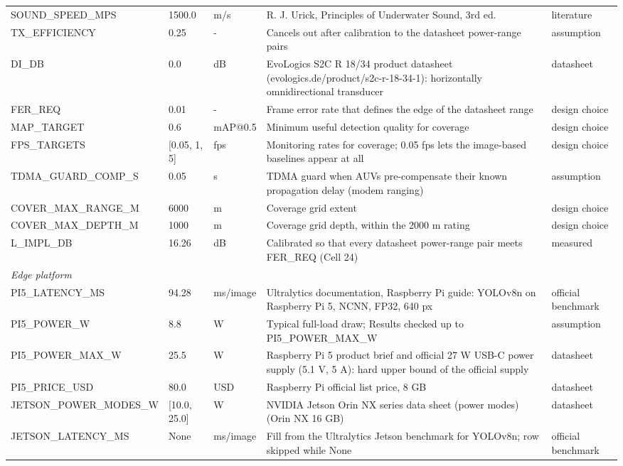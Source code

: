 \begin{table}[t]
\begin{tabular}{p{3.3cm}p{2.6cm}p{1.6cm}p{6.6cm}p{2.0cm}}
SOUND\_SPEED\_MPS & 1500.0 & m/s & R. J. Urick, Principles of Underwater Sound, 3rd ed. & literature \\
TX\_EFFICIENCY & 0.25 & - & Cancels out after calibration to the datasheet power-range pairs & assumption \\
DI\_DB & 0.0 & dB & EvoLogics S2C R 18/34 product datasheet (evologics.de/product/s2c-r-18-34-1): horizontally omnidirectional transducer & datasheet \\
FER\_REQ & 0.01 & - & Frame error rate that defines the edge of the datasheet range & design choice \\
MAP\_TARGET & 0.6 & mAP@0.5 & Minimum useful detection quality for coverage & design choice \\
FPS\_TARGETS & [0.05, 1, 5] & fps & Monitoring rates for coverage; 0.05 fps lets the image-based baselines appear at all & design choice \\
TDMA\_GUARD\_COMP\_S & 0.05 & s & TDMA guard when AUVs pre-compensate their known propagation delay (modem ranging) & assumption \\
COVER\_MAX\_RANGE\_M & 6000 & m & Coverage grid extent & design choice \\
COVER\_MAX\_DEPTH\_M & 1000 & m & Coverage grid depth, within the 2000 m rating & design choice \\
L\_IMPL\_DB & 16.26 & dB & Calibrated so that every datasheet power-range pair meets FER\_REQ (Cell 24) & measured \\
\multicolumn{5}{l}{\textit{Edge platform}} \\
PI5\_LATENCY\_MS & 94.28 & ms/image & Ultralytics documentation, Raspberry Pi guide: YOLOv8n on Raspberry Pi 5, NCNN, FP32, 640 px & official benchmark \\
PI5\_POWER\_W & 8.8 & W & Typical full-load draw; Results checked up to PI5\_POWER\_MAX\_W & assumption \\
PI5\_POWER\_MAX\_W & 25.5 & W & Raspberry Pi 5 product brief and official 27 W USB-C power supply (5.1 V, 5 A): hard upper bound of the official supply & datasheet \\
PI5\_PRICE\_USD & 80.0 & USD & Raspberry Pi official list price, 8 GB & datasheet \\
JETSON\_POWER\_MODES\_W & [10.0, 25.0] & W & NVIDIA Jetson Orin NX series data sheet (power modes) (Orin NX 16 GB) & datasheet \\
JETSON\_LATENCY\_MS & None & ms/image & Fill from the Ultralytics Jetson benchmark for YOLOv8n; row skipped while None & official benchmark \\

\end{tabular}
\end{table}
